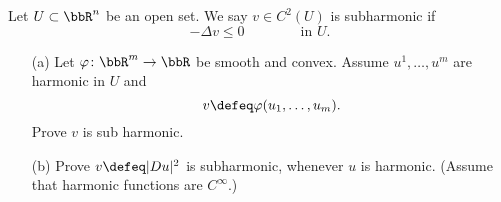 \begin{problem}
  Let \(U\subset\bbR^n\) be an open set. We say \(v \in C^2(U)\) is
  subharmonic if
  \[
    -\Delta v\leq 0\qquad\qquad\text{in \(U\).}
  \]
  \begin{itemize}
  \item[(a)] Let \(\varphi\colon\bbR^m\to\bbR\) be smooth and
    convex. Assume \(u^1,\dotsc,u^m\) are harmonic in \(U\) and
    \[
      v\defeq\varphi(u_1,\dotsc,u_m).
    \]
    Prove \(v\) is sub harmonic.

    \noindent
    [\emph{Hint:} Convexity for a smooth function \(\varphi(z)\) is
    equivalent to \(\sum_{j,k=1}^m\varphi_{z_j,z_k}(z)\xi_j\xi_j\geq 0\)
    for any \(\xi\in\bbR^m\).]
  \item[(b)] Prove \(v\defeq|Du|^2\) is subharmonic, whenever \(u\) is
    harmonic. (Assume that harmonic functions are \(C^\infty\).)
  \end{itemize}
\end{problem}
\begin{solution}

\end{solution}

